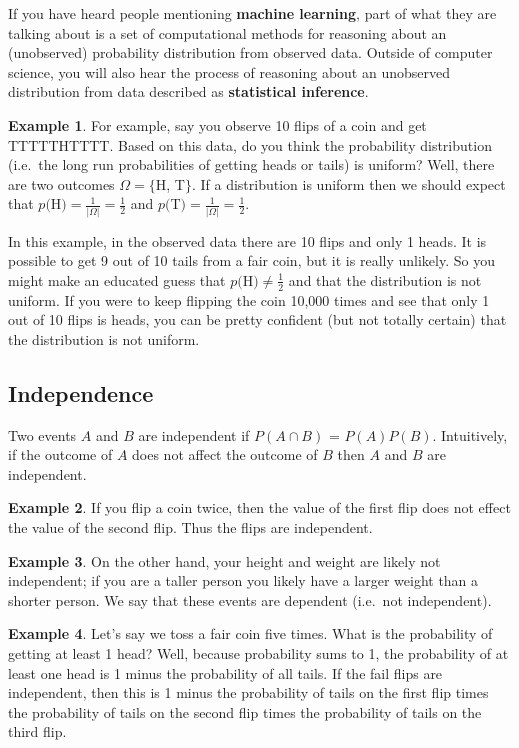 \documentclass[]{article}
\theoremstyle{definition}
\newtheorem{exmp}{Example}[section]
\begin{document}
If you have heard people mentioning \textbf{machine learning}, part of what they are talking about is a set of computational methods for reasoning about an (unobserved) probability distribution from observed data. Outside of computer science, you will also hear the process of reasoning about an unobserved distribution from data described as \textbf{statistical inference}.

\begin{exmp}
For example, say you observe 10 flips of a coin and get TTTTTHTTTT. Based on this data, do you think the probability distribution (i.e.\ the long run probabilities of getting heads or tails) is uniform? Well, there are two outcomes $\Omega=\{$H, T$\}$. If a distribution is uniform then we should expect that $p($H$) = \frac{1}{\vert \Omega \vert} =  \frac{1}{2}$ and $p($T$) = \frac{1}{\vert \Omega \vert} = \frac{1}{2}$. 

In this example, in the observed data there are 10 flips and only 1 heads. It is possible to get 9 out of 10 tails from a fair coin, but it is really unlikely. So you might make an educated guess that $p($H$) \neq \frac{1}{2}$ and that the distribution is not uniform. If you were to keep flipping the coin 10,000 times and see that only 1 out of 10 flips is heads, you can be pretty confident (but not totally certain) that the distribution is not uniform. 
\end{exmp}

\subsection{Independence}

Two events $A$ and $B$ are independent if $P(A \cap B)$ = $P(A)P(B)$. Intuitively, if the outcome of $A$ does not affect the outcome of $B$ then $A$ and $B$ are independent. 

\begin{exmp}
If you flip a coin twice, then the value of the first flip does not effect the value of the second flip. Thus the flips are independent.
\end{exmp} 

\begin{exmp}
On the other hand, your height and weight are likely not independent; if you are a taller person you likely have a larger weight than a shorter person. We say that these events are dependent (i.e.\ not independent).
\end{exmp} 

\begin{exmp}
Let's say we toss a fair coin five times. What is the probability of getting at least 1 head? Well, because probability sums to 1, the probability of at least one head is 1 minus the probability of all tails. If the fail flips are independent, then this is 1 minus the probability of tails on the first flip times the probability of tails on the second flip times the probability of tails on the third flip. 
\end{exmp}
\end{document}

